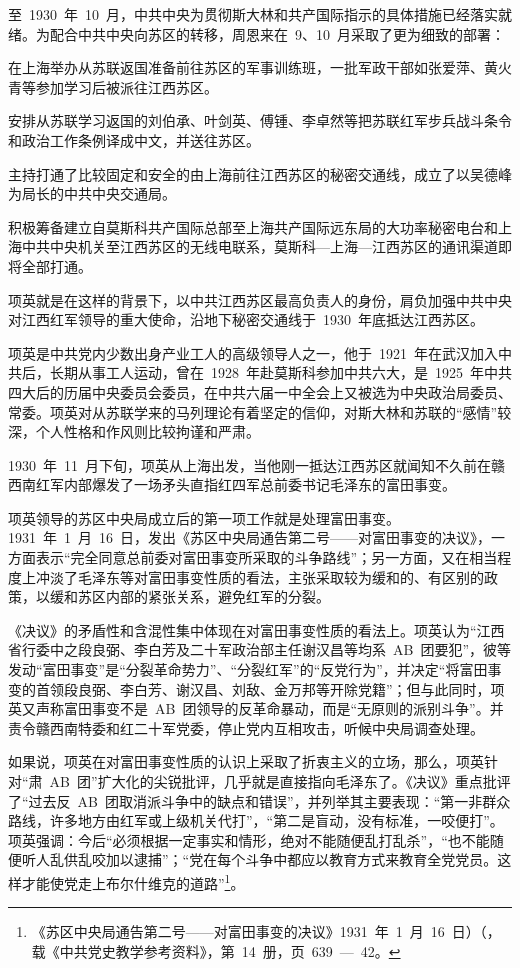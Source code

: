至~1930~年~10~月，中共中央为贯彻斯大林和共产国际指示的具体措施已经落实就绪。为配合中共中央向苏区的转移，周恩来在~9、10~月采取了更为细致的部署：

在上海举办从苏联返国准备前往苏区的军事训练班，一批军政干部如张爱萍、黄火青等参加学习后被派往江西苏区。

安排从苏联学习返国的刘伯承、叶剑英、傅锺、李卓然等把苏联红军步兵战斗条令和政治工作条例译成中文，并送往苏区。

主持打通了比较固定和安全的由上海前往江西苏区的秘密交通线，成立了以吴德峰为局长的中共中央交通局。

积极筹备建立自莫斯科共产国际总部至上海共产国际远东局的大功率秘密电台和上海中共中央机关至江西苏区的无线电联系，莫斯科—上海—江西苏区的通讯渠道即将全部打通。

项英就是在这样的背景下，以中共江西苏区最高负责人的身份，肩负加强中共中央对江西红军领导的重大使命，沿地下秘密交通线于~1930~年底抵达江西苏区。

项英是中共党内少数出身产业工人的高级领导人之一，他于~1921~年在武汉加入中共后，长期从事工人运动，曾在~1928~年赴莫斯科参加中共六大，是~1925~年中共四大后的历届中央委员会委员，在中共六届一中全会上又被选为中央政治局委员、常委。项英对从苏联学来的马列理论有着坚定的信仰，对斯大林和苏联的“感情”较深，个人性格和作风则比较拘谨和严肃。

1930~年~11~月下旬，项英从上海出发，当他刚一抵达江西苏区就闻知不久前在赣西南红军内部爆发了一场矛头直指红四军总前委书记毛泽东的富田事变。

项英领导的苏区中央局成立后的第一项工作就是处理富田事变。1931~年~1~月~16~日，发出《苏区中央局通告第二号——对富田事变的决议》，一方面表示“完全同意总前委对富田事变所采取的斗争路线”；另一方面，又在相当程度上冲淡了毛泽东等对富田事变性质的看法，主张采取较为缓和的、有区别的政策，以缓和苏区内部的紧张关系，避免红军的分裂。

《决议》的矛盾性和含混性集中体现在对富田事变性质的看法上。项英认为“江西省行委中之段良弼、李白芳及二十军政治部主任谢汉昌等均系~AB~团要犯”，彼等发动“富田事变”是“分裂革命势力”、“分裂红军”的“反党行为”，并决定“将富田事变的首领段良弼、李白芳、谢汉昌、刘敌、金万邦等开除党籍”；但与此同时，项英又声称富田事变不是~AB~团领导的反革命暴动，而是“无原则的派别斗争”。并责令赣西南特委和红二十军党委，停止党内互相攻击，听候中央局调查处理。

如果说，项英在对富田事变性质的认识上采取了折衷主义的立场，那么，项英针对“肃~AB~团”扩大化的尖锐批评，几乎就是直接指向毛泽东了。《决议》重点批评了“过去反~AB~团取消派斗争中的缺点和错误”，并列举其主要表现：“第一非群众路线，许多地方由红军或上级机关代打”，“第二是盲动，没有标准，一咬便打”。项英强调：今后“必须根据一定事实和情形，绝对不能随便乱打乱杀”，“也不能随便听人乱供乱咬加以逮捕”；“党在每个斗争中都应以教育方式来教育全党党员。这样才能使党走上布尔什维克的道路”\footnote{《苏区中央局通告第二号——对富田事变的决议》1931~年~1~月~16~日）（，载《中共党史教学参考资料》，第~14~册，页~639~—~42。}。


